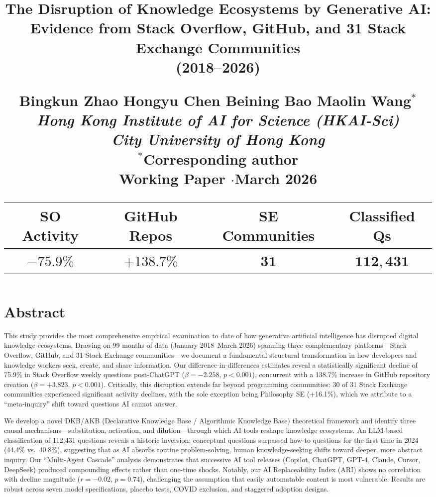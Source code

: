 \documentclass[11pt,a4paper]{article}
\title{
\vspace{-1cm}
{\Large\bfseries The Disruption of Knowledge Ecosystems by Generative AI:\\[0.3em]
Evidence from Stack Overflow, GitHub, and 31 Stack Exchange Communities\\(2018--2026)}
\vspace{0.5cm}

{\normalsize Bingkun Zhao \quad Hongyu Chen \quad Beining Bao \quad Maolin Wang$^{*}$}\\[0.3em]
{\small\itshape Hong Kong Institute of AI for Science (HKAI-Sci)\\
City University of Hong Kong}\\[0.3em]
{\small $^{*}$Corresponding author}\\[0.5em]
{\small Working Paper \quad$\cdot$\quad March 2026}

\vspace{0.8cm}
\begin{tabular}{cccc}
\toprule
\textbf{SO Activity} & \textbf{GitHub Repos} & \textbf{SE Communities} & \textbf{Classified Qs} \\
\midrule
$\mathbf{-75.9\%}$ & $\mathbf{+138.7\%}$ & $\mathbf{31}$ & $\mathbf{112{,}431}$ \\
\bottomrule
\end{tabular}
}
\date{}
\begin{document}
\maketitle
\thispagestyle{empty}

\newpage
\section*{Abstract}

This study provides the most comprehensive empirical examination to date of how generative artificial intelligence has disrupted digital knowledge ecosystems. Drawing on 99 months of data (January 2018--March 2026) spanning three complementary platforms---Stack Overflow, GitHub, and 31 Stack Exchange communities---we document a fundamental structural transformation in how developers and knowledge workers seek, create, and share information. Our difference-in-differences estimates reveal a statistically significant decline of 75.9\% in Stack Overflow weekly questions post-ChatGPT ($\beta = -2.258$, $p < 0.001$), concurrent with a 138.7\% increase in GitHub repository creation ($\beta = +3.823$, $p < 0.001$). Critically, this disruption extends far beyond programming communities: 30 of 31 Stack Exchange communities experienced significant activity declines, with the sole exception being Philosophy SE (+16.1\%), which we attribute to a ``meta-inquiry'' shift toward questions AI cannot answer.

We develop a novel DKB/AKB (Declarative Knowledge Base / Algorithmic Knowledge Base) theoretical framework and identify three causal mechanisms---substitution, activation, and dilution---through which AI tools reshape knowledge ecosystems. An LLM-based classification of 112,431 questions reveals a historic inversion: conceptual questions surpassed how-to questions for the first time in 2024 (44.4\% vs.\ 40.8\%), suggesting that as AI absorbs routine problem-solving, human knowledge-seeking shifts toward deeper, more abstract inquiry. Our ``Multi-Agent Cascade'' analysis demonstrates that successive AI tool releases (Copilot, ChatGPT, GPT-4, Claude, Cursor, DeepSeek) produced compounding effects rather than one-time shocks. Notably, our AI Replaceability Index (ARI) shows no correlation with decline magnitude ($r = -0.02$, $p = 0.74$), challenging the assumption that easily automatable content is most vulnerable. Results are robust across seven model specifications, placebo tests, COVID exclusion, and staggered adoption designs.
\end{document}
